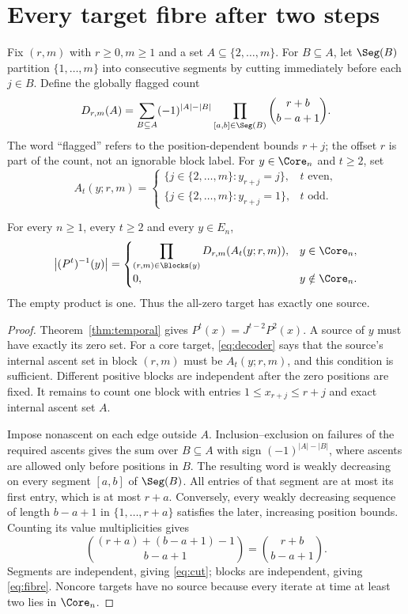 \section{Every target fibre after two steps}
Fix $(r,m)$ with $r\ge0,m\ge1$ and a set $A\subseteq\{2,\ldots,m\}$.
For $B\subseteq A$, let $\Seg(B)$ partition $\{1,\ldots,m\}$ into
consecutive segments by cutting immediately before each $j\in B$.
Define the globally flagged count
\begin{equation}\label{eq:cut}
 D_{r,m}(A)=\sum_{B\subseteq A}(-1)^{|A|-|B|}
       \prod_{[a,b]\in\Seg(B)}\binom{r+b}{b-a+1}.
\end{equation}
The word ``flagged'' refers to the position-dependent bounds $r+j$;
the offset $r$ is part of the count, not an ignorable block label.
For $y\in\Core_n$ and $t\ge2$, set
\begin{equation}\label{eq:mask}
 A_t(y;r,m)=
 \begin{cases}
 \{j\in\{2,\ldots,m\}:y_{r+j}=j\},&t\text{ even},\\
 \{j\in\{2,\ldots,m\}:y_{r+j}=1\},&t\text{ odd}.
 \end{cases}
\end{equation}

\begin{theorem}\label{thm:fibre}
For every $n\ge1$, every $t\ge2$ and every $y\in E_n$,
\begin{equation}\label{eq:fibre}
 \bigl|(P^t)^{-1}(y)\bigr|=
 \begin{cases}
 \displaystyle\prod_{(r,m)\in\Blocks(y)}D_{r,m}(A_t(y;r,m)),
       &y\in\Core_n,\\
 0,&y\notin\Core_n.
 \end{cases}
\end{equation}
The empty product is one. Thus the all-zero target has exactly one source.
\end{theorem}
\begin{proof}
Theorem~\ref{thm:temporal} gives $P^t(x)=J^{t-2}P^2(x)$.
A source of $y$ must have exactly its zero set. For a core target,
\eqref{eq:decoder} says that the source's internal ascent set in block
$(r,m)$ must be $A_t(y;r,m)$, and this condition is sufficient.
Different positive blocks are independent after the zero positions are
fixed. It remains to count one block with entries $1\le x_{r+j}\le r+j$
and exact internal ascent set $A$.

Impose nonascent on each edge outside $A$. Inclusion--exclusion on failures
of the required ascents gives the sum over $B\subseteq A$ with sign
$(-1)^{|A|-|B|}$, where ascents are allowed only before positions in $B$.
The resulting word is weakly decreasing on every segment $[a,b]$ of
$\Seg(B)$. All entries of that segment are at most its first entry,
which is at most $r+a$. Conversely, every weakly decreasing sequence of
length $b-a+1$ in $\{1,\ldots,r+a\}$ satisfies the later, increasing
position bounds. Counting its value multiplicities gives
\[
 \binom{(r+a)+(b-a+1)-1}{b-a+1}=\binom{r+b}{b-a+1}.
\]
Segments are independent, giving \eqref{eq:cut}; blocks are independent,
giving \eqref{eq:fibre}. Noncore targets have no source because every
iterate at time at least two lies in $\Core_n$.
\end{proof}

